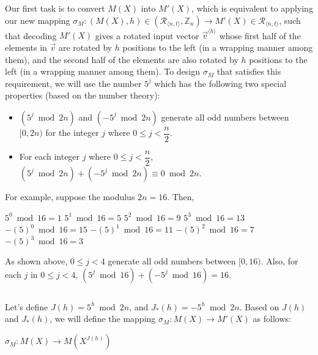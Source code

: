 $ $

 Our first task is to convert $M(X)$ into $M'(X)$, which is equivalent to applying our new mapping $\sigma_M : (M(X), h) \in (\mathcal{R}_{\langle n, t \rangle}, \mathbb{Z}_{n}) \longrightarrow M'(X) \in \mathcal{R}_{\langle n, t \rangle}$, such that decoding $M'(X)$ gives a rotated input vector $\vec{v}^{\langle h \rangle}$ whose first half of the elements in $\vec{v}$ are rotated by $h$ positions to the left (in a wrapping manner among them), and the second half of the elements are also rotated by $h$ positions to the left (in a wrapping manner among them). To design $\sigma_M$ that satisfies this requirement, we will use the number $5^j$ which has the following two special properties (based on the number theory):
\begin{itemize}
\item $(5^j \bmod 2n)$ and $(-5^j \bmod 2n)$ generate all odd numbers between $[0, 2n)$ for the integer $j$ where $0 \leq j < \dfrac{n}{2}$. 
\item For each integer $j$ where $0 \leq j < \dfrac{n}{2}$, $(5^j \bmod 2n) + (-5^j \bmod 2n) \equiv 0 \bmod 2n$. 
\end{itemize}
For example, suppose the modulus $2n = 16$. Then, 

\begin{multicols}{2}
\noindent $5^0 \bmod 16 = 1$
\newline $5^1 \bmod 16 = 5$
\newline $5^2 \bmod 16 = 9$
\newline $5^3 \bmod 16 = 13$
\newline $-(5)^0 \bmod 16 = 15$
\newline $-(5)^1 \bmod 16 = 11$
\newline $-(5)^2 \bmod 16 = 7$
\newline $-(5)^3 \bmod 16 = 3$
\end{multicols}


As shown above, $0 \leq j < 4$ generate all odd numbers between $[0, 16)$. Also, for each $j$ in $0 \leq j < 4$, $(5^j \bmod 16) + (-5^j \bmod 16) = 16$. 

$ $

Let's define $J(h) = 5^h \bmod 2n$, \text{ } and \text{ } $J_*(h) = -5^h \bmod 2n$. Based on $J(h)$ and $J_*(h)$, we will define the mapping $\sigma_M : M(X) \rightarrow M'(X)$ as follows:

$\sigma_{M} : M(X) \rightarrow M(X^{J(h)})$

$ $

